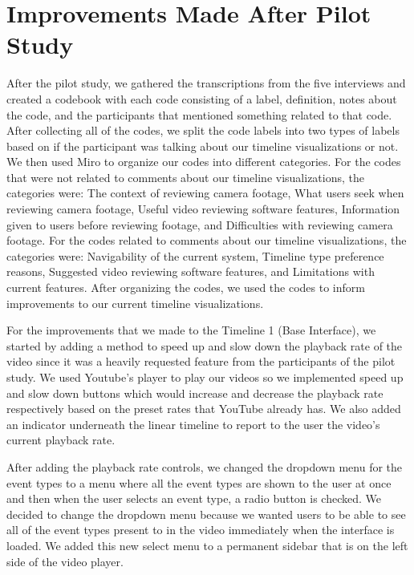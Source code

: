 \documentclass[doublespace,draft,nopageskip]{VTthesis} %
\begin{document}
\section{Improvements Made After Pilot Study} \label{se:one_section}
After the pilot study, we gathered the transcriptions from the five interviews and created a codebook with each code consisting of a label, definition, notes about the code, and the participants that mentioned something related to that code. After collecting all of the codes, we split the code labels into two types of labels based on if the participant was talking about our timeline visualizations or not.  We then used Miro to organize our codes into different categories. For the codes that were not related to comments about our timeline visualizations, the categories were: The context of reviewing camera footage, What users seek when reviewing camera footage, Useful video reviewing software features, Information given to users before reviewing footage, and Difficulties with reviewing camera footage. For the codes related to comments about our timeline visualizations, the categories were: Navigability of the current system, Timeline type preference reasons, Suggested video reviewing software features, and Limitations with current features. After organizing the codes, we used the codes to inform improvements to our current timeline visualizations.

For the improvements that we made to the Timeline 1 (Base Interface), we started by adding a method to speed up and slow down the playback rate of the video since it was a heavily requested feature from the participants of the pilot study. We used Youtube's player to play our videos so we implemented speed up and slow down buttons which would increase and decrease the playback rate respectively based on the preset rates that YouTube already has. We also added an indicator underneath the linear timeline to report to the user the video's current playback rate.

After adding the playback rate controls, we changed the dropdown menu for the event types to a menu where all the event types are shown to the user at once and then when the user selects an event type, a radio button is checked. We decided to change the dropdown menu because we wanted users to be able to see all of the event types present to in the video immediately when the interface is loaded. We added this new select menu to a permanent sidebar that is on the left side of the video player.
\end{document}
